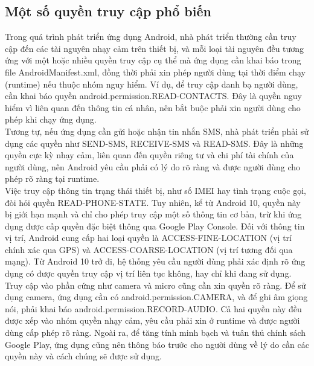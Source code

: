 \subsection{Một số quyền truy cập phổ biến}
    \begin{flushleft}
        \hspace*{0.8cm}Trong quá trình phát triển ứng dụng Android, nhà phát triển thường cần truy cập đến các tài nguyên nhạy cảm trên thiết bị, và mỗi loại tài nguyên đều tương ứng với một hoặc nhiều quyền truy cập cụ thể mà ứng dụng cần khai báo trong file AndroidManifest.xml, đồng thời phải xin phép người dùng tại thời điểm chạy (runtime) nếu thuộc nhóm nguy hiểm. Ví dụ, để truy cập danh bạ người dùng, cần khai báo quyền android.permission.READ-CONTACTS. Đây là quyền nguy hiểm vì liên quan đến thông tin cá nhân, nên bắt buộc phải xin người dùng cho phép khi chạy ứng dụng.\\
        \hspace*{0.8cm}Tương tự, nếu ứng dụng cần gửi hoặc nhận tin nhắn SMS, nhà phát triển phải sử dụng các quyền như SEND-SMS, RECEIVE-SMS và READ-SMS. Đây là những quyền cực kỳ nhạy cảm, liên quan đến quyền riêng tư và chi phí tài chính của người dùng, nên Android yêu cầu phải có lý do rõ ràng và được người dùng cho phép rõ ràng tại runtime.\\
        \hspace*{0.8cm}Việc truy cập thông tin trạng thái thiết bị, như số IMEI hay tình trạng cuộc gọi, đòi hỏi quyền READ-PHONE-STATE. Tuy nhiên, kể từ Android 10, quyền này bị giới hạn mạnh và chỉ cho phép truy cập một số thông tin cơ bản, trừ khi ứng dụng được cấp quyền đặc biệt thông qua Google Play Console. Đối với thông tin vị trí, Android cung cấp hai loại quyền là ACCESS-FINE-LOCATION (vị trí chính xác qua GPS) và ACCESS-COARSE-LOCATION (vị trí tương đối qua mạng). Từ Android 10 trở đi, hệ thống yêu cầu người dùng phải xác định rõ ứng dụng có được quyền truy cập vị trí liên tục không, hay chỉ khi đang sử dụng.\\
        \hspace*{0.8cm}Truy cập vào phần cứng như camera và micro cũng cần xin quyền rõ ràng. Để sử dụng camera, ứng dụng cần có android.permission.CAMERA, và để ghi âm giọng nói, phải khai báo android.permission.RECORD-AUDIO. Cả hai quyền này đều được xếp vào nhóm quyền nhạy cảm, yêu cầu phải xin ở runtime và được người dùng cấp phép rõ ràng. Ngoài ra, để tăng tính minh bạch và tuân thủ chính sách Google Play, ứng dụng cũng nên thông báo trước cho người dùng về lý do cần các quyền này và cách chúng sẽ được sử dụng.
    

\end{flushleft}
